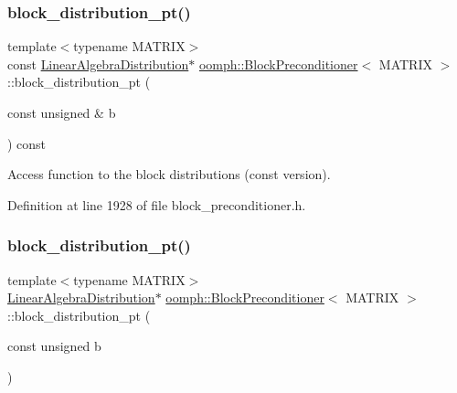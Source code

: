 \subsubsection{\texorpdfstring{block\+\_\+distribution\+\_\+pt()}{block\_distribution\_pt()}\hspace{0.1cm}{\footnotesize\ttfamily [1/2]}}
{\footnotesize\ttfamily template$<$typename M\+A\+T\+R\+IX$>$ \\
const \hyperlink{classoomph_1_1LinearAlgebraDistribution}{Linear\+Algebra\+Distribution}$\ast$ \hyperlink{classoomph_1_1BlockPreconditioner}{oomph\+::\+Block\+Preconditioner}$<$ M\+A\+T\+R\+IX $>$\+::block\+\_\+distribution\+\_\+pt (\begin{DoxyParamCaption}\item[{const unsigned \&}]{b }\end{DoxyParamCaption}) const\hspace{0.3cm}{\ttfamily [inline]}}



Access function to the block distributions (const version). 



Definition at line 1928 of file block\+\_\+preconditioner.\+h.

\mbox{\label{classoomph_1_1BlockPreconditioner_ace28659098240524c431a41cf419d4ba}} 
\subsubsection{\texorpdfstring{block\+\_\+distribution\+\_\+pt()}{block\_distribution\_pt()}\hspace{0.1cm}{\footnotesize\ttfamily [2/2]}}
{\footnotesize\ttfamily template$<$typename M\+A\+T\+R\+IX$>$ \\
\hyperlink{classoomph_1_1LinearAlgebraDistribution}{Linear\+Algebra\+Distribution}$\ast$ \hyperlink{classoomph_1_1BlockPreconditioner}{oomph\+::\+Block\+Preconditioner}$<$ M\+A\+T\+R\+IX $>$\+::block\+\_\+distribution\+\_\+pt (\begin{DoxyParamCaption}\item[{const unsigned}]{b }\end{DoxyParamCaption})\hspace{0.3cm}{\ttfamily [inline]}}



